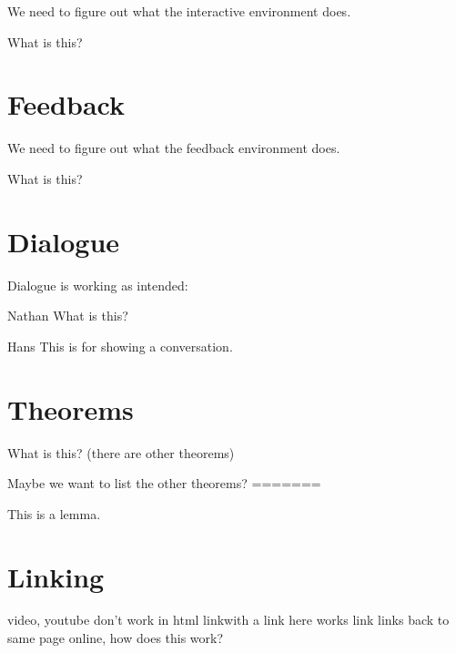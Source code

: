 \documentclass{ximera}
\begin{document}
We need to figure out what the interactive environment does.

\begin{interactive}
What is this?
\end{interactive}



\section{Feedback}

We need to figure out what the feedback environment does.

\begin{feedback}
What is this?
\end{feedback}



\section{Dialogue}

Dialogue is working as intended:

\begin{dialogue}
\item[Nathan] What is this?
\item[Hans] This is for showing a conversation.
\end{dialogue}



\section{Theorems}

\begin{theorem}
What is this? (there are other theorems)
\end{theorem}

Maybe we want to list the other theorems?
=======
\begin{lemma}
This is a lemma.
\end{lemma}



\section{Linking}

video, youtube don't work in html
link{with a link here} works
link{} links back to same page online, how does this work?

\link{} %
\end{document}
